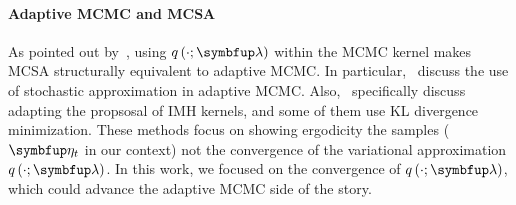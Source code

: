 \vspace{-1.5ex}
\paragraph{Adaptive MCMC and MCSA}
As pointed out by~\citet{pmlr-v124-ou20a}, using \(q\left(\cdot; \vlambda\right)\) within the MCMC kernel makes MCSA structurally equivalent to adaptive MCMC.
In particular,~\citet{10.1007/s11222-008-9110-y, garthwaite_adaptive_2016, pmlr-v151-brofos22a, gabrie_adaptive_2022} discuss the use of stochastic approximation in adaptive MCMC.
Also,~\citet{andrieu_ergodicity_2006, keith_adaptive_2008, holden_adaptive_2009, giordani_adaptive_2010, pmlr-v151-brofos22a, habib2018auxiliary, neklyudov_metropolishastings_2019} specifically discuss adapting the propsosal of IMH kernels, and some of them use KL divergence minimization.
These methods focus on showing ergodicity the samples (\(\veta_t\) in our context) not the convergence of the variational approximation \(q\left(\cdot; \vlambda\right)\).
In this work, we focused on the convergence of \(q\left(\cdot; \vlambda\right)\), which could advance the adaptive MCMC side of the story.



